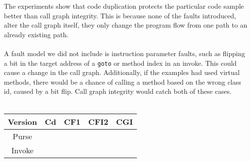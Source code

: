 The experiments show that code duplication protects the particular code sample better than call graph integrity. This is because none of the faults introduced, alter the call graph itself, they only change the program flow from one path to an already existing path.\\\\
A fault model we did not include is instruction parameter faults, such as flipping a bit in the target address of a \texttt{goto} or method index in an invoke. This could cause a change in the call graph. Additionally, if the examples had used virtual methods, there would be a chance of calling a method based on the wrong class id, caused by a bit flip. Call graph integrity would catch both of these cases.\\\\



\begin{tabular}{|c|c|c|c|c|}
\hline Version & Cd & CF1 & CFI2 & CGI \\ 
\hline Purse &  &  &  &  \\ 
\hline Invoke &  &  &  &  \\ 
\hline 
\end{tabular} 